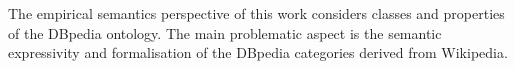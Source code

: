 The empirical semantics perspective of this work considers classes and properties of the DBpedia ontology. The main problematic aspect is the semantic expressivity and formalisation of the DBpedia categories derived from Wikipedia.